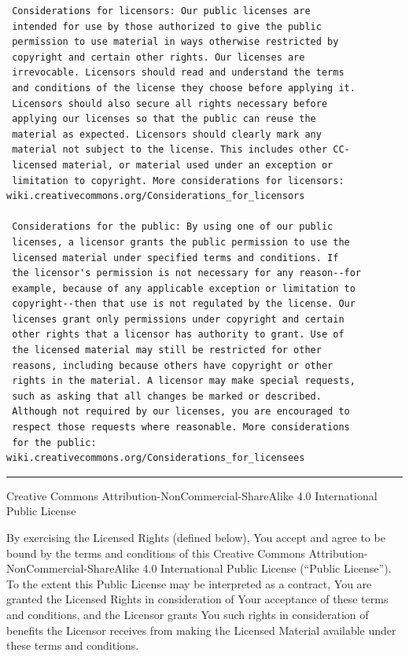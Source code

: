 \documentclass[
]{scrbook}
\begin{document}
\begin{verbatim}
 Considerations for licensors: Our public licenses are
 intended for use by those authorized to give the public
 permission to use material in ways otherwise restricted by
 copyright and certain other rights. Our licenses are
 irrevocable. Licensors should read and understand the terms
 and conditions of the license they choose before applying it.
 Licensors should also secure all rights necessary before
 applying our licenses so that the public can reuse the
 material as expected. Licensors should clearly mark any
 material not subject to the license. This includes other CC-
 licensed material, or material used under an exception or
 limitation to copyright. More considerations for licensors:
wiki.creativecommons.org/Considerations_for_licensors

 Considerations for the public: By using one of our public
 licenses, a licensor grants the public permission to use the
 licensed material under specified terms and conditions. If
 the licensor's permission is not necessary for any reason--for
 example, because of any applicable exception or limitation to
 copyright--then that use is not regulated by the license. Our
 licenses grant only permissions under copyright and certain
 other rights that a licensor has authority to grant. Use of
 the licensed material may still be restricted for other
 reasons, including because others have copyright or other
 rights in the material. A licensor may make special requests,
 such as asking that all changes be marked or described.
 Although not required by our licenses, you are encouraged to
 respect those requests where reasonable. More considerations
 for the public:
wiki.creativecommons.org/Considerations_for_licensees
\end{verbatim}

\begin{center}\rule{0.5\linewidth}{0.5pt}\end{center}

Creative Commons Attribution-NonCommercial-ShareAlike 4.0 International
Public License

By exercising the Licensed Rights (defined below), You accept and agree
to be bound by the terms and conditions of this Creative Commons
Attribution-NonCommercial-ShareAlike 4.0 International Public License
(``Public License''). To the extent this Public License may be
interpreted as a contract, You are granted the Licensed Rights in
consideration of Your acceptance of these terms and conditions, and the
Licensor grants You such rights in consideration of benefits the
Licensor receives from making the Licensed Material available under
these terms and conditions.
\end{document}

